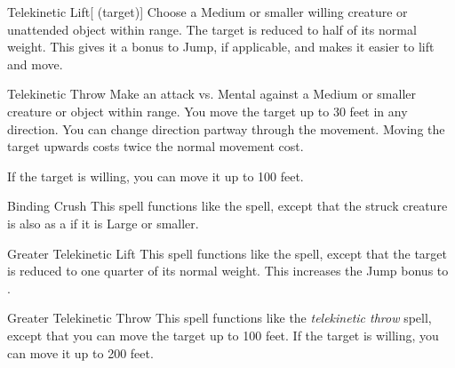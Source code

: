 \lowercase{\hypertarget{spell:Telekinetic Lift}{}}\label{spell:Telekinetic Lift}
\begin{ability}[\nth{1}]{\hypertarget{spell:Telekinetic Lift}{Telekinetic Lift}}[ (target)]
Choose a Medium or smaller willing creature or unattended object within \rngclose range.
The target is reduced to half of its normal weight.
This gives it a  bonus to Jump, if applicable, and makes it easier to lift and move.
\end{ability}
\vspace{0.25em}



\lowercase{\hypertarget{spell:Telekinetic Throw}{}}\label{spell:Telekinetic Throw}
\begin{ability}[\nth{1}]{\hypertarget{spell:Telekinetic Throw}{Telekinetic Throw}}
Make an attack vs. Mental against a Medium or smaller creature or object within \rngmed range.
\hit You move the target up to 30 feet in any direction.
You can change direction partway through the movement.
Moving the target upwards costs twice the normal movement cost.

If the target is willing, you can move it up to 100 feet.
\end{ability}
\vspace{0.25em}



\lowercase{\hypertarget{spell:Binding Crush}{}}\label{spell:Binding Crush}
\begin{ability}[\nth{2}]{\hypertarget{spell:Binding Crush}{Binding Crush}}
This spell functions like the  spell, except that the struck creature is also  as a  if it is Large or smaller.
\end{ability}
\vspace{0.25em}



\lowercase{\hypertarget{spell:Greater Telekinetic Lift}{}}\label{spell:Greater Telekinetic Lift}
\begin{ability}[\nth{3}]{\hypertarget{spell:Greater Telekinetic Lift}{Greater Telekinetic Lift}}
This spell functions like the  spell, except that the target is reduced to one quarter of its normal weight.
This increases the Jump bonus to .
\end{ability}
\vspace{0.25em}



\lowercase{\hypertarget{spell:Greater Telekinetic Throw}{}}\label{spell:Greater Telekinetic Throw}
\begin{ability}[\nth{3}]{\hypertarget{spell:Greater Telekinetic Throw}{Greater Telekinetic Throw}}
This spell functions like the \textit{telekinetic throw} spell, except that you can move the target up to 100 feet.
If the target is willing, you can move it up to 200 feet.
\end{ability}
\vspace{0.25em}



